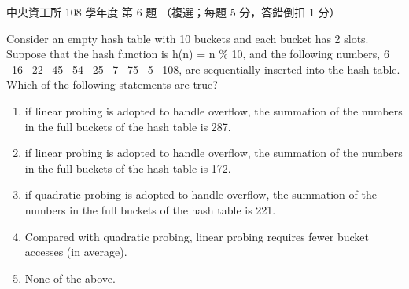 \begin{pastexam}[label={px:ncu-108-dsa-06}]{中央資工所 108 學年度 第 6 題}
（複選；每題 5 分，答錯倒扣 1 分）

Consider an empty hash table with 10 buckets and each bucket has 2 slots. Suppose that the hash
function is h(n) = n \% 10, and the following numbers, 6 \ 16 \ 22 \ 45 \ 54 \ 25 \ 7 \ 75 \ 5 \ 108,
are sequentially inserted into the hash table. Which of the following statements are true?
\begin{enumerate}[label=(\Alph*)]
\item if linear probing is adopted to handle overflow, the summation of the numbers in the full
buckets of the hash table is 287.
\item if linear probing is adopted to handle overflow, the summation of the numbers in the full
buckets of the hash table is 172.
\item if quadratic probing is adopted to handle overflow, the summation of the numbers in the full
buckets of the hash table is 221.
\item Compared with quadratic probing, linear probing requires fewer bucket accesses (in average).
\item None of the above.
\end{enumerate}
\end{pastexam}

